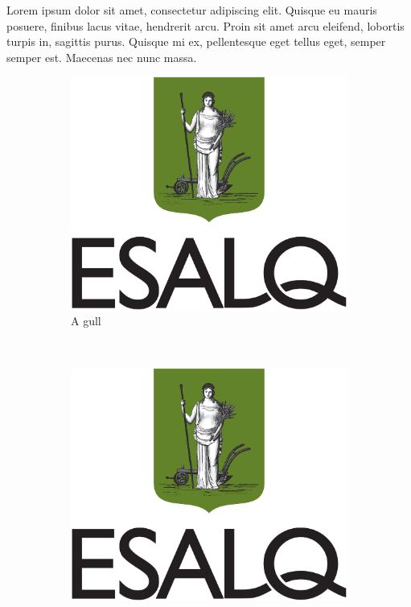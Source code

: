 \documentclass{article}
\begin{document}
\begin{figure}[!ht]
\begin{minipage}{0.2\textwidth}
	 	\end{minipage}
	 	
	 \end{figure}
	
	Lorem ipsum dolor sit amet, consectetur adipiscing elit. Quisque eu mauris posuere, finibus lacus vitae, hendrerit arcu. Proin sit amet arcu eleifend, lobortis turpis in, sagittis purus. Quisque mi ex, pellentesque eget tellus eget, semper semper est. Maecenas nec nunc massa. 
	
	\begin{figure}
		\centering
		\begin{subfigure}[b]{0.3\textwidth}
			\includegraphics[width=\textwidth]{Figuras/brasao_esalq1.jpg}
			\caption{A gull}
			\label{fig:gull}
		\end{subfigure}
		~ %
		\begin{subfigure}[b]{0.3\textwidth}
			\includegraphics[width=\textwidth]{Figuras/brasao_esalq1.jpg}

\end{subfigure}
\end{figure}
\end{document}
